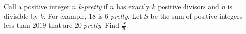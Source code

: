 Call a positive integer $n$ $k$\textit{-pretty} if $n$ has exactly $k$ positive divisors and $n$ is divisible by $k$. For example, $18$ is $6$\textit{-pretty}. Let $S$ be the sum of positive integers less than $2019$ that are $20$\textit{-pretty}. Find $\tfrac{S}{20}$.